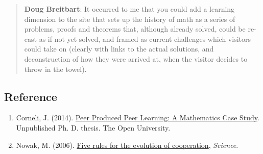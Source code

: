 \begin{quote}
\textbf{Doug Breitbart}: It occurred to me that you could add a learning
dimension to the site that sets up the history of math as a series of
problems, proofs and theorems that, although already solved, could be
re-cast as if not yet solved, and framed as current challenges which
visitors could take on (clearly with links to the actual solutions, and
deconstruction of how they were arrived at, when the visitor decides to
throw in the towel).
\end{quote}
\subsection{Reference}

\begin{enumerate}
\item
  Corneli, J. (2014).
  \href{http://metameso.org/~joe/thesis-outline.html}{Peer Produced Peer
  Learning: A Mathematics Case Study}. Unpublished Ph. D. thesis. The
  Open University.
\item
  Nowak, M. (2006).
  \href{http://www.sciencemag.org/content/314/5805/1560.full}{Five rules
  for the evolution of cooperation}, \emph{Science}.
\end{enumerate}

